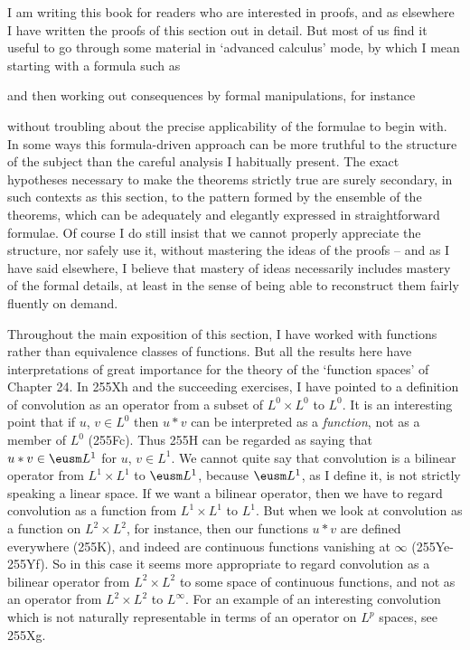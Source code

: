 {I am writing this book for readers who are interested in proofs, and as
elsewhere I have written the proofs of this section out in detail.   But
most of us find it useful to go through some
material in `advanced calculus' mode, by which I mean starting with a
formula such as


\noindent and then working out consequences by formal manipulations, for
instance


\noindent without troubling about the precise applicability of the
formulae to begin with.   In some ways this formula-driven approach can
be more truthful to the structure of the subject than the careful
analysis I habitually present.   The exact hypotheses necessary to make
the theorems strictly true are surely secondary, in such contexts as
this section, to the pattern formed by the ensemble of the theorems,
which can be adequately and elegantly expressed in straightforward
formulae.   Of course I do still insist that we cannot properly
appreciate the structure, nor safely use it, without mastering the ideas
of the proofs -- and as I have said elsewhere, I believe that mastery of
ideas necessarily includes mastery of the formal details, at least in
the sense of being able to reconstruct them fairly fluently
on demand.

Throughout the main exposition of this section, I have worked with
functions rather than equivalence classes of functions.    But all the
results here have interpretations of great importance for the theory of
the `function spaces' of Chapter 24.   In 255Xh and the succeeding
exercises, I have pointed to a definition of convolution as an operator
from a subset of $L^0\times L^0$ to $L^0$.
It is an interesting point
that if $u$, $v\in L^0$ then $u*v$ can be interpreted as a
{\it function}, not as a member of $L^0$ (255Fc).
Thus 255H can be regarded as saying that $u*v\in\eusm L^1$
for $u$, $v\in L^1$.   We cannot quite say that convolution is a
bilinear operator from $L^1\times L^1$ to $\eusm L^1$, because $\eusm L^1$,
as I define it,
is not strictly speaking a linear space.   If we want a bilinear
operator, then we have to regard convolution as a function from
$L^1\times L^1$ to $L^1$.   But when we look at convolution as a
function on $L^2\times L^2$, for instance, then our functions $u*v$ are
defined everywhere (255K), and indeed are continuous functions vanishing
at $\infty$ (255Ye-255Yf).   So in this case it seems more appropriate
to regard convolution as a bilinear operator from $L^2\times L^2$ to
some space of continuous functions, and not as an operator from
$L^2\times L^2$ to $L^{\infty}$.   For an example of an interesting
convolution which is not naturally representable in terms of an operator
on $L^p$ spaces, see 255Xg.

}
